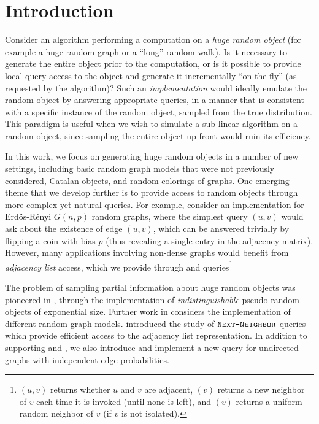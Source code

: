 \section{Introduction}
Consider an algorithm performing a computation on a \emph{huge random object} (for example a huge random graph or a ``long'' random walk).
Is it necessary to generate the entire object prior to the computation,
or is it possible to provide local query access to the object and generate it incrementally ``on-the-fly'' (as requested by the algorithm)?
Such an \emph{implementation} would ideally emulate the random object by answering appropriate queries,
in a manner that is consistent with a specific instance of the random object, sampled from the true distribution.
This paradigm is useful when we wish to simulate a sub-linear algorithm on a random object,
since sampling the entire object up front would ruin its efficiency.

In this work, we focus on generating huge random objects in a number of new settings,
including basic random graph models that were not previously considered, Catalan objects, and random colorings of graphs.
One emerging theme that we develop further is to provide access to random objects through more complex yet natural queries.
For example, consider an implementation for Erd\"os-R\'enyi $G(n,p)$ random graphs,
where the simplest query $(u,v)$ would ask about the existence of edge $(u,v)$,
which can be answered trivially by flipping a coin with bias $p$ (thus revealing a single entry in the adjacency matrix).
However, many applications involving non-dense graphs would benefit from \emph{adjacency list} access,
which we provide through  and  queries\footnote{
\label{foot:graph_queries}
$(u,v)$ returns whether $u$ and $v$ are adjacent, $(v)$ returns a new neighbor of $v$ each time
it is invoked (until none is left), and $(v)$ returns a uniform random neighbor of $v$ (if $v$ is not isolated).}

The problem of sampling partial information about huge random objects was pioneered in \cite{huge,huge_old,huge_journal},
through the implementation of \emph{indistinguishable} pseudo-random objects of exponential size.
Further work in \cite{sparse,reut} considers the implementation of different random graph models.
\cite{reut} introduced the study of $\texttt{\textsc{Next-Neighbor}}$ queries which provide efficient access to the adjacency list representation.
In addition to supporting  and ,
we also introduce and implement a new  query for undirected graphs with independent edge probabilities.


